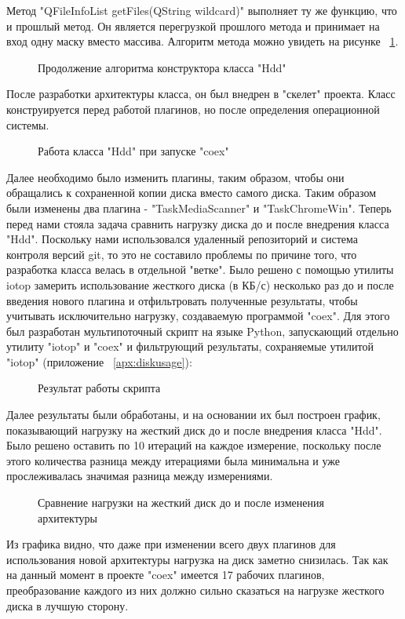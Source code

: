 Метод "QFileInfoList getFiles(QString wildcard)" выполняет ту же функцию, что и прошлый метод. Он является перегрузкой прошлого метода и принимает на вход одну маску вместо массива. Алгоритм метода можно увидеть на рисунке ~\ref{bok_8:bok_8}.

\begin{figure}[!ht]
\caption{ Продолжение алгоритма конструктора класса "Hdd" }
\label{bok_8:bok_8}
\end{figure}

После разработки архитектуры класса, он был внедрен в "скелет" проекта. Класс конструируется перед работой плагинов, но после определения операционной системы.

\begin{figure}[!ht]
\caption{ Работа класса "Hdd" при запуске "coex" }
\label{bok_3:bok_3}
\end{figure}

Далее необходимо было изменить плагины, таким образом, чтобы они обращались к сохраненной копии диска вместо самого диска. Таким образом были изменены два плагина - "TaskMediaScanner" и "TaskChromeWin".
Теперь перед нами стояла задача сравнить нагрузку диска до и после внедрения класса "Hdd". Поскольку нами использовался удаленный репозиторий и система контроля версий git, то это не составило проблемы по причине того, что разработка класса велась в отдельной "ветке".
Было решено с помощью утилиты iotop замерить использование жесткого диска (в КБ/с) несколько раз до и после введения нового плагина и отфильтровать полученные результаты, чтобы учитывать исключительно нагрузку, создаваемую программой "coex". Для этого был разработан мультипоточный скрипт на языке Python, запускающий отдельно утилиту "iotop" и "coex" и фильтрующий результаты, сохраняемые утилитой "iotop" (приложение ~\ref{apx:diskusage}):

\begin{figure}[!ht]
\caption{ Результат работы скрипта }
\label{bok_4:bok_4}
\end{figure}

Далее результаты были обработаны, и на основании их был построен график, показывающий нагрузку на жесткий диск до и после внедрения класса "Hdd". Было решено оставить по 10 итераций на каждое измерение, поскольку после этого количества разница между итерациями была минимальна и уже прослеживалась значимая разница между измерениями.

\begin{figure}[!ht]
\caption{ Сравнение нагрузки на жесткий диск до и после изменения архитектуры }
\label{bok_5:bok_5}
\end{figure}

Из графика видно, что даже при изменении всего двух плагинов для использования новой архитектуры нагрузка на диск заметно снизилась. Так как на данный момент в проекте "coex" имеется 17 рабочих плагинов, преобразование каждого из них должно сильно сказаться на нагрузке жесткого диска в лучшую сторону.

\clearpage

